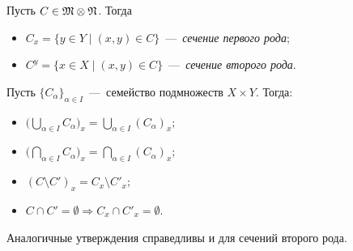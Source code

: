 \begin{definition}
    Пусть $C \in \mathfrak{M} \otimes \mathfrak{N}$. Тогда \begin{itemize}
        \item $C_x = \{y \in Y \mid (x, y) \in C\}$~---~\textit{сечение первого рода};
        \item $C^y = \{x \in X \mid (x, y) \in C\}$~---~\textit{сечение второго рода}.
    \end{itemize}
\end{definition}
\begin{lemma}
    Пусть $\{C_\alpha\}_{\alpha \in I}$~---~семейство подмножеств $X \times Y$. Тогда:
    \begin{itemize}
        \item $\displaystyle \biggl(\bigcup\limits_{\alpha \in I} C_\alpha \biggr)_x = \bigcup\limits_{\alpha \in I} \left(C_\alpha\right)_x;$
        \item $\displaystyle \biggl(\bigcap\limits_{\alpha \in I} C_\alpha \biggr)_x = \bigcap\limits_{\alpha \in I} \left(C_\alpha\right)_x;$
        \item $\displaystyle (C \setminus C')_x = C_x \setminus C'_x;$
        \item $\displaystyle C \cap C' = \emptyset \Rightarrow C_x \cap C'_x = \emptyset.$
    \end{itemize}
    Аналогичные утверждения справедливы и для сечений второго рода.
\end{lemma}
